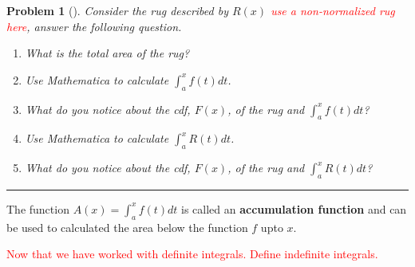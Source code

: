 \documentclass[letterpaper,oneside]{book}%
\theoremstyle{plain}
\theoremstyle{box}
\theoremstyle{problem}
\newtheorem{problemnum}{Problem}[chapter]
\newenvironment{problem}[1][]{\begin{problemnum}[#1]}{\end{problemnum}\nopagebreak\hrule\bigskip}
\begin{document}
\begin{problem}
Consider the rug described by $R(x)$ \textcolor{red}{use a non-normalized rug here}, answer the following question.
\begin{enumerate}
\item What is the total area of the rug?
\item Use Mathematica to calculate $\int_a^x f(t)dt$.
\item What do you notice about the cdf, $F(x)$, of the rug and $\int_a^x f(t)dt$?
\item Use Mathematica to calculate $\int_a^x R(t)dt$.
\item What do you notice about the cdf, $F(x)$, of the rug and $\int_a^x R(t)dt$?
\end{enumerate}
\end{problem}

The function $A(x) = \int_a^x f(t)dt$ is called an \textbf{accumulation function} and can be used to calculated the area below the function $f$ upto $x$.

\textcolor{red}{Now that we have worked with definite integrals. Define indefinite integrals.}

\end{document}
